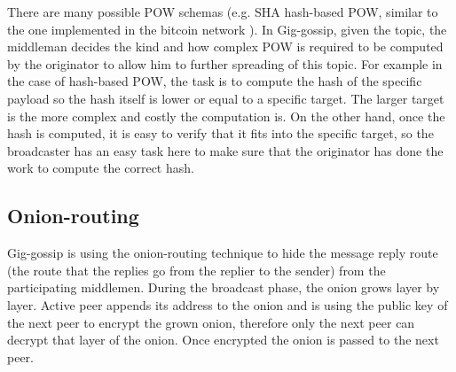 \documentclass{article}
\begin{document}
There are many possible POW schemas (e.g. SHA hash-based POW, similar to the one implemented in the bitcoin network \cite{nakamoto2009bitcoin}). In Gig-gossip, given the topic, the middleman decides the kind and how complex POW is required to be computed by the originator to allow him to further spreading of this topic. For example in the case of hash-based POW, the task is to compute the hash of the specific payload so the hash itself is lower or equal to a specific target. The larger target is the more complex and costly the computation is. On the other hand, once the hash is computed, it is easy to verify that it fits into the specific target, so the broadcaster has an easy task here to make sure that the originator has done the work to compute the correct hash.

\subsection{Onion-routing}

Gig-gossip is using the onion-routing technique to hide the message reply route (the route that the replies go from the replier to the sender) from the participating middlemen. During the broadcast phase, the onion grows layer by layer. Active peer appends its address to the onion and is using the public key of the next peer to encrypt the grown onion, therefore only the next peer can decrypt that layer of the onion. Once encrypted the onion is passed to the next peer.
\end{document}
